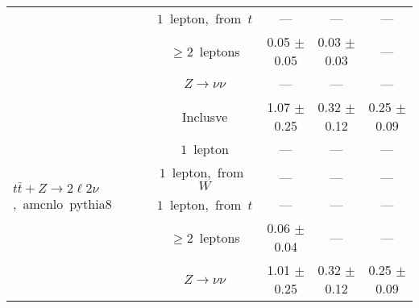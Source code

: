 \documentclass{article}
\begin{document}
\begin{longtable}{|l|c|c|c|c|}
 & $1$~lepton,~from~$t$  & ---  & ---  & --- \\* 
 & $\ge2$~leptons  & 0.05 $\pm$ 0.05  & 0.03 $\pm$ 0.03  & --- \\* 
 & $Z\rightarrow\nu\nu$  & ---  & ---  & --- \\* 
\hline 
\multirow{6}{*}{$t\bar{t}+Z{\rightarrow}2{\ell}2{\nu}$,~amcnlo~pythia8} & Inclusve  & 1.07 $\pm$ 0.25  & 0.32 $\pm$ 0.12  & 0.25 $\pm$ 0.09 \\* 
 & $1$~lepton  & ---  & ---  & --- \\* 
 & $1$~lepton,~from~$W$  & ---  & ---  & --- \\* 
 & $1$~lepton,~from~$t$  & ---  & ---  & --- \\* 
 & $\ge2$~leptons  & 0.06 $\pm$ 0.04  & ---  & --- \\* 
 & $Z\rightarrow\nu\nu$  & 1.01 $\pm$ 0.25  & 0.32 $\pm$ 0.12  & 0.25 $\pm$ 0.09 \\* 
\hline 
\end{longtable} 

 
 
 
 
\pagebreak 

 
 
 
 
\end{document}
